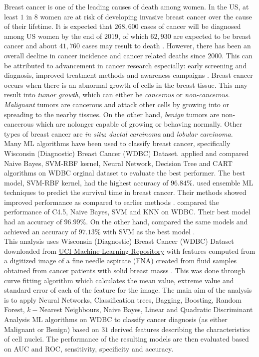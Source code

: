 \noindent Breast cancer is one of the leading causes of death among women. In the US, at least $1$ in $8$ women are at risk of developing invasive breast cancer over the cause of their lifetime. It is expected that $268,600$ cases of cancer will be diagnosed among US women by the end of $2019$, of which $62,930$ are expected to be breast cancer and about $41,760$ cases may result to death \citep{uscancer2019}. However, there has been an overall decline in cancer incidence and cancer related deaths since $2000$. This can be attributed to advancement in cancer research especially: early screening and diagnosis, improved treatment methods and awareness campaigns \citep{asri2016using}. Breast cancer occurs when there is an abnormal growth of cells in the breast tissue. This may result into \textit{tumor growth}, which can either be \textit{cancerous} or \textit{non-cancerous}. \textit{Malignant} tumors are cancerous and attack other cells by growing into or spreading to the nearby tissues. On the other hand, \textit{benign} tumors are non-cancerous which are nolonger capable of growing or behaving normally. Other types of breast cancer are \textit{in situ}: \textit{ductal carcinoma} and \textit{lobular carcinoma}.\\

\noindent Many ML algorithms have been used to classify breast cancer, specifically Wisconsin (Diagnostic) Breast Cancer (WDBC) Dataset. \citet{chaurasia2017data} applied and compared Naive Bayes, SVM-RBF kernel, Neural Network, Decision Tree and CART algorithms on WDBC orginal dataset to evaluate the best performer. The best model, SVM-RBF kernel, had the highest accuracy of $96.84\%$. \citet{djebbari2008ensemble} used ensemble ML techniques to predict the survival time in breast cancer. Their methods showed improved performance as compared to earlier methods \citep{asri2016using}. \citet{aruna2011knowledge} compared the performance of C4.5, Naive Bayes, SVM and KNN on WDBC. Their best model had an accuracy of $96.99\%$. On the other hand, \citet{asri2016using} compared the same models and achieved an accuracy of $97.13\%$ with SVM as the best model \citep{asri2016using}.\\


\noindent This analysis uses  Wisconsin (Diagnostic) Breast Cancer (WDBC) Dataset downloaded from \href{https://archive.ics.uci.edu/ml/datasets/Breast+Cancer+Wisconsin+(Diagnostic)}{UCI Machine Learning Repository} with features computed from a digitized image of a fine needle aspirate (FNA) created from fluid samples obtained from cancer patients with solid breast masss \citep{ucidata}. This was done through curve fitting algorithm which calculates the mean value, extreme value and standard error of each of the feature for the image. The main aim of the analysis is to apply Neural Networks, Classification trees, Bagging, Boosting, Random Forest, $k-$Nearest Neighbours, Naive Bayes, Linear and Quadratic Discriminant Analysis ML algorithms on WDBC to classify cancer diagnosis (as either Malignant or Benign) based on $31$ derived features describing the characteristics of cell nuclei. The performance of the resulting models are then evaluated based on AUC and ROC, sensitivity, specificity and accuracy.

